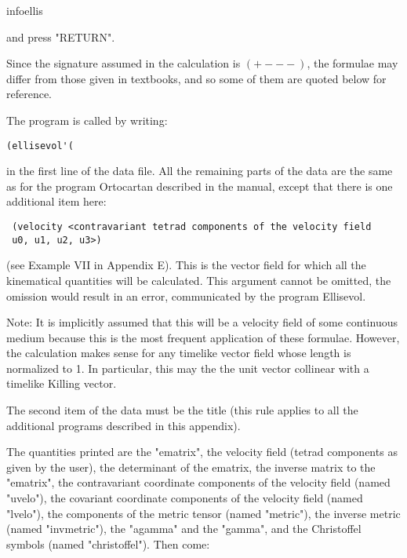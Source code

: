 \bigskip

infoellis

\bigskip

\noindent and press "RETURN".

Since the signature assumed in the calculation is $(+ - - -)$, the formulae may
differ from those given in textbooks, and so some of them are quoted below for
reference.

The program is called by writing:

\bigskip

\begin{verbatim}
(ellisevol'(
\end{verbatim}

\bigskip

\noindent in the first line of the data file. All the remaining parts of the
data are the same as for the program Ortocartan described in the manual, except
that there is one additional item here:

\bigskip

\begin{verbatim}
 (velocity <contravariant tetrad components of the velocity field
 u0, u1, u2, u3>)
\end{verbatim}

\bigskip

\noindent (see Example VII in Appendix E). This is the vector field for which
all the kinematical quantities will be calculated. This argument cannot be
omitted, the omission would result in an error, communicated by the program
Ellisevol.

Note: It is implicitly assumed that this will be a velocity field of some
continuous medium because this is the most frequent application of these
formulae. However, the calculation makes sense for any timelike vector field
whose length is normalized to 1. In particular, this may the the unit vector
collinear with a timelike Killing vector.

The second item of the data must be the title (this rule applies to all the
additional programs described in this appendix).

The quantities printed are the "ematrix", the velocity field (tetrad components
as given by the user), the determinant of the ematrix, the inverse matrix to
the "ematrix", the contravariant coordinate components of the velocity field
(named "uvelo"), the covariant coordinate components of the velocity field
(named "lvelo"), the components of the metric tensor (named "metric"), the
inverse metric (named "invmetric"), the "agamma" and the "gamma", and the
Christoffel symbols (named "christoffel"). Then come:

